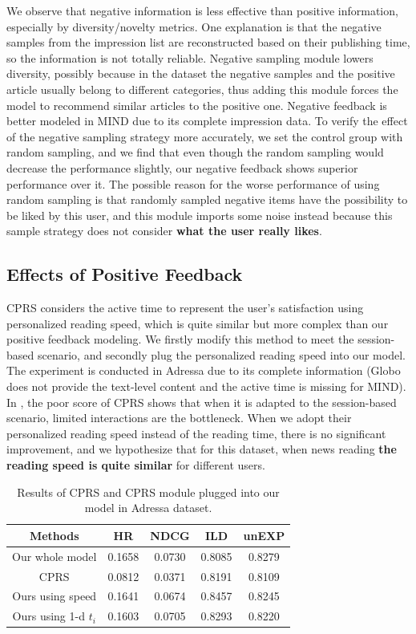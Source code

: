 We observe that negative information is less effective than positive information, especially by diversity/novelty metrics. 
One explanation is that the negative samples from the impression list are reconstructed based on their publishing time, so the information is not totally reliable. Negative sampling module lowers diversity, possibly because in the dataset the negative samples and the positive article usually belong to different categories, thus adding this module forces the model to recommend similar articles to the positive one. Negative feedback is better modeled in MIND due to its complete impression data. To verify the effect of the negative sampling strategy more accurately, we set the control group with random sampling, and we find that even though the random sampling would decrease the performance slightly, our negative feedback shows superior performance over it. The possible reason for the worse performance of using random sampling is that randomly sampled negative items have the possibility to be liked by this user, and this module imports some noise instead because this sample strategy does not consider \textbf{what the user really likes}. 


\subsection{Effects of Positive Feedback}
CPRS considers the active time to represent the user's satisfaction using personalized reading speed, which is quite similar but more complex than our positive feedback modeling. We firstly modify this method to meet the 
session-based scenario, and secondly plug the personalized reading speed into our model. 
The experiment is conducted in Adressa due to its complete information 
(Globo does not provide the text-level content and the active time is missing for MIND). 
In , the poor score of CPRS shows that when it is adapted to the session-based scenario, 
limited interactions are the bottleneck. When we adopt their personalized reading speed instead of 
the reading time, there is no significant improvement, and we hypothesize that for this dataset, 
when news reading \textbf{the reading speed is quite similar} for different users.

\begin{table}[th]
  \caption{Results of CPRS and CPRS module plugged into our model in Adressa dataset.}
  \label{tb:CPRS}
  \centering
  \begin{tabular}{c|cccc}
    \toprule
    Methods  & HR & NDCG & ILD & unEXP\\
    \midrule
    Our whole model & 0.1658 & 0.0730 & 0.8085 & 0.8279\\
    \midrule
    CPRS & 0.0812 & 0.0371 & 0.8191 & 0.8109\\
    Ours using speed & 0.1641 & 0.0674 & 0.8457 & 0.8245\\
    Ours using 1-d $t_i$ & 0.1603 & 0.0705 & 0.8293 & 0.8220\\
    \bottomrule
  \end{tabular}
\end{table}

